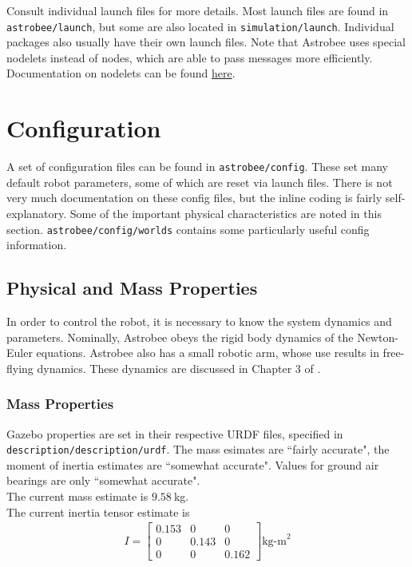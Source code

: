 \documentclass{article}
\begin{document}
Consult individual launch files for more details. Most launch files are found in \texttt{astrobee/launch}, but some are also located in \texttt{simulation/launch}. Individual packages also usually have their own launch files. Note that Astrobee uses special nodelets instead of nodes, which are able to pass messages more efficiently. Documentation on nodelets can be found \href{http://wiki.ros.org/nodelet}{here}.

\section{Configuration}

A set of configuration files can be found in \texttt{astrobee/config}. These set many default robot parameters, some of which are reset via launch files. There is not very much documentation on these config files, but the inline coding is fairly self-explanatory. Some of the important physical characteristics are noted in this section. \texttt{astrobee/config/worlds} contains some particularly useful config information.

\subsection{Physical and Mass Properties}

In order to control the robot, it is necessary to know the system dynamics and parameters. Nominally, Astrobee obeys the rigid body dynamics of the Newton-Euler equations. Astrobee also has a small robotic arm, whose use results in free-flying dynamics. These dynamics are discussed in Chapter 3 of \cite{Albee2019}.

\subsubsection{Mass Properties}

Gazebo properties are set in their respective URDF files, specified in \\
\texttt{description/description/urdf}. The mass esimates are ``fairly accurate", the moment of inertia estimates are ``somewhat accurate". Values for ground air bearings are only ``somewhat accurate".
\\

The current mass estimate is $9.58\ $kg.
\\

The current inertia tensor estimate is
\begin{align*}
    I =  
    \begin{bmatrix}
              0.153 & 0 & 0\\
              0 & 0.143 & 0\\
              0 & 0 & 0.162
    \end{bmatrix}  \text{kg-m}^2\\
\end{align*}
\end{document}
